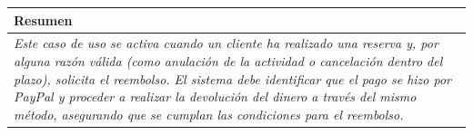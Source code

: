         \begin{table}[H]
            \begin{tabular}{llllllll}
        \hline
        \multicolumn{8}{|l|}{\cellcolor[HTML]{F2F2F2}Resumen}                                                                                                                                                                                                                                                                                                                                                                                             \\ \hline
        \multicolumn{8}{|p{15cm}|}{{\color[HTML]{808080} \textit{Este caso de uso se activa cuando un cliente ha realizado una reserva y, por alguna razón válida (como anulación de la actividad o cancelación dentro del plazo), solicita el reembolso. El sistema debe identificar que el pago se hizo por PayPal y proceder a realizar la devolución del dinero a través del mismo método, asegurando que se cumplan las condiciones para el reembolso.}}} \\ \hline
        \end{tabular}
        \end{table}

